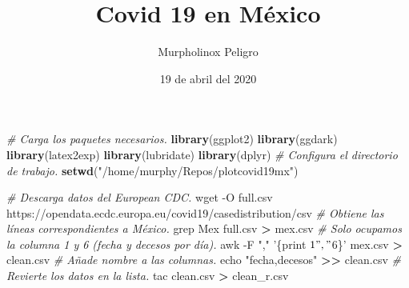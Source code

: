 \documentclass[]{article}
\title{Covid 19 en México}
\author{Murpholinox Peligro}
\date{19 de abril del 2020}
\newenvironment{Shaded}{\begin{snugshade}}{\end{snugshade}}
\newcommand{\BuiltInTok}[1]{#1}
\newcommand{\CommentTok}[1]{\textcolor[rgb]{0.56,0.35,0.01}{\textit{#1}}}
\newcommand{\FunctionTok}[1]{\textcolor[rgb]{0.00,0.00,0.00}{#1}}
\newcommand{\KeywordTok}[1]{\textcolor[rgb]{0.13,0.29,0.53}{\textbf{#1}}}
\newcommand{\NormalTok}[1]{#1}
\newcommand{\OperatorTok}[1]{\textcolor[rgb]{0.81,0.36,0.00}{\textbf{#1}}}
\newcommand{\StringTok}[1]{\textcolor[rgb]{0.31,0.60,0.02}{#1}}
\begin{document}
\maketitle

\begin{Shaded}
\begin{Highlighting}[]
\CommentTok{# Carga los paquetes necesarios.}
\KeywordTok{library}\NormalTok{(ggplot2)}
\KeywordTok{library}\NormalTok{(ggdark)}
\KeywordTok{library}\NormalTok{(latex2exp)}
\KeywordTok{library}\NormalTok{(lubridate)}
\KeywordTok{library}\NormalTok{(dplyr)}
\CommentTok{# Configura el directorio de trabajo.}
\KeywordTok{setwd}\NormalTok{(}\StringTok{"/home/murphy/Repos/plotcovid19mx"}\NormalTok{)}
\end{Highlighting}
\end{Shaded}

\begin{Shaded}
\begin{Highlighting}[]
\CommentTok{# Descarga datos del European CDC.}
\FunctionTok{wget}\NormalTok{ -O full.csv https://opendata.ecdc.europa.eu/covid19/casedistribution/csv}
\CommentTok{# Obtiene las líneas correspondientes a México.}
\FunctionTok{grep}\NormalTok{ Mex full.csv }\OperatorTok{>}\NormalTok{ mex.csv}
\CommentTok{# Solo ocupamos la columna 1 y 6 (fecha y decesos por día).}
\FunctionTok{awk}\NormalTok{ -F }\StringTok{","} \StringTok{'\{print $1"," $6\}'}\NormalTok{ mex.csv }\OperatorTok{>}\NormalTok{ clean.csv}
\CommentTok{# Añade nombre a las columnas.}
\BuiltInTok{echo} \StringTok{"fecha,decesos"} \OperatorTok{>>}\NormalTok{ clean.csv}
\CommentTok{# Revierte los datos en la lista.}
\FunctionTok{tac}\NormalTok{ clean.csv }\OperatorTok{>}\NormalTok{ clean_r.csv}
\end{Highlighting}
\end{Shaded}
\end{document}
